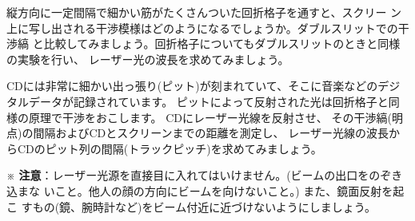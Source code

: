 
縦方向に一定間隔で細かい筋がたくさんついた回折格子を通すと、スクリー
ン上に写し出される干渉模様はどのようになるでしょうか。ダブルスリットでの干渉縞
と比較してみましょう。回折格子についてもダブルスリットのときと同様の実験を行い、
レーザー光の波長を求めてみましょう。

\bigskip


%


CDには非常に細かい出っ張り(ピット)が刻まれていて、そこに音楽などのデジタルデータが記録されています。
ピットによって反射された光は回折格子と同様の原理で干渉をおこします。
CDにレーザー光線を反射させ、
その干渉縞(明点)の間隔およびCDとスクリーンまでの距離を測定し、
レーザー光線の波長からCDのピット列の間隔(トラックピッチ)を求めてみましょう。


\bigskip


\hspace*{-\parindent}
※ {\bf 注意}：レーザー光源を直接目に入れてはいけません。(ビームの出口をのぞき込まな
いこと。他人の顔の方向にビームを向けないこと。) また、鏡面反射を起こ
すもの(鏡、腕時計など)をビーム付近に近づけないようにしましょう。